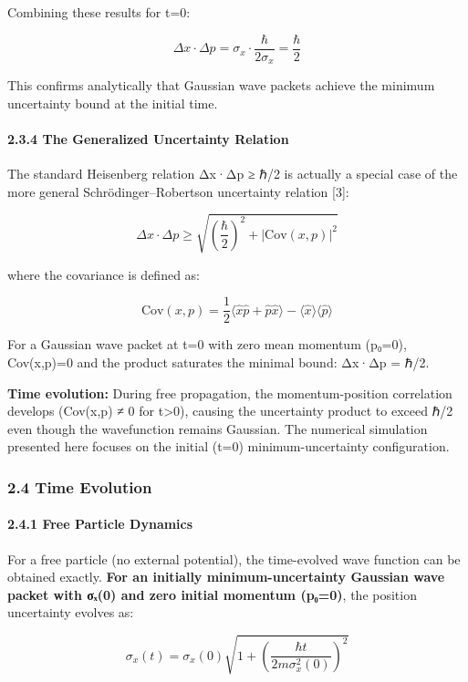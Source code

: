 \documentclass[
]{article}
\begin{document}
Combining these results for t=0:

\[\Delta x \cdot \Delta p = \sigma_x \cdot \frac{\hbar}{2\sigma_x} = \frac{\hbar}{2}\]

This confirms analytically that Gaussian wave packets achieve the
minimum uncertainty bound at the initial time.

\paragraph{2.3.4 The Generalized Uncertainty
Relation}\label{the-generalized-uncertainty-relation}

The standard Heisenberg relation Δx·Δp ≥ ℏ/2 is actually a special case
of the more general Schrödinger--Robertson uncertainty relation {[}3{]}:

\[\Delta x \cdot \Delta p \geq \sqrt{\left(\frac{\hbar}{2}\right)^2 + |\text{Cov}(x,p)|^2}\]

where the covariance is defined as:

\[\text{Cov}(x,p) = \frac{1}{2}\langle \hat{x}\hat{p} + \hat{p}\hat{x} \rangle - \langle \hat{x} \rangle \langle \hat{p} \rangle\]

For a Gaussian wave packet at t=0 with zero mean momentum (p₀=0),
Cov(x,p)=0 and the product saturates the minimal bound: Δx·Δp = ℏ/2.

\textbf{Time evolution:} During free propagation, the momentum-position
correlation develops (Cov(x,p) ≠ 0 for t\textgreater0), causing the
uncertainty product to exceed ℏ/2 even though the wavefunction remains
Gaussian. The numerical simulation presented here focuses on the initial
(t=0) minimum-uncertainty configuration.

\subsubsection{2.4 Time Evolution}\label{time-evolution}

\paragraph{2.4.1 Free Particle Dynamics}\label{free-particle-dynamics}

For a free particle (no external potential), the time-evolved wave
function can be obtained exactly. \textbf{For an initially
minimum-uncertainty Gaussian wave packet with σₓ(0) and zero initial
momentum (p₀=0)}, the position uncertainty evolves as:

\[\sigma_x(t) = \sigma_x(0)\sqrt{1 + \left(\frac{\hbar t}{2m\sigma_x^2(0)}\right)^2}\]
\end{document}
